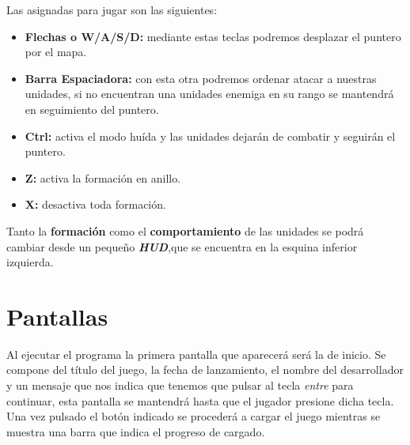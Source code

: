 Las asignadas para jugar son las siguientes:
\begin{itemize}
	\item \textbf{Flechas o W/A/S/D:} mediante estas teclas podremos desplazar el puntero por el mapa.
	\item \textbf{Barra Espaciadora:} con esta otra podremos ordenar atacar a nuestras unidades,
									  si no encuentran una unidades enemiga en su rango se mantendrá
									  en seguimiento del puntero.
	\item \textbf{Ctrl:} activa el modo huída y las unidades dejarán de combatir y seguirán el
					  puntero.	
	\item \textbf{Z:} activa la formación en anillo.									  
	\item \textbf{X:} desactiva toda formación.
\end{itemize}

Tanto la \textbf{formación} como el \textbf{comportamiento} de las unidades se podrá cambiar desde un
pequeño \textbf{\textit{HUD}},que se encuentra en la esquina inferior izquierda.

\section{Pantallas}
Al ejecutar el programa la primera pantalla que aparecerá será la de 
inicio. Se compone del título del juego, la fecha de lanzamiento,
el nombre del desarrollador y un mensaje que nos indica que tenemos que pulsar al tecla
\textit{entre} para continuar, esta pantalla se mantendrá hasta que el jugador presione
dicha tecla.\\
Una vez pulsado el botón indicado se procederá a cargar el juego mientras se muestra
una barra que indica el progreso de cargado.

